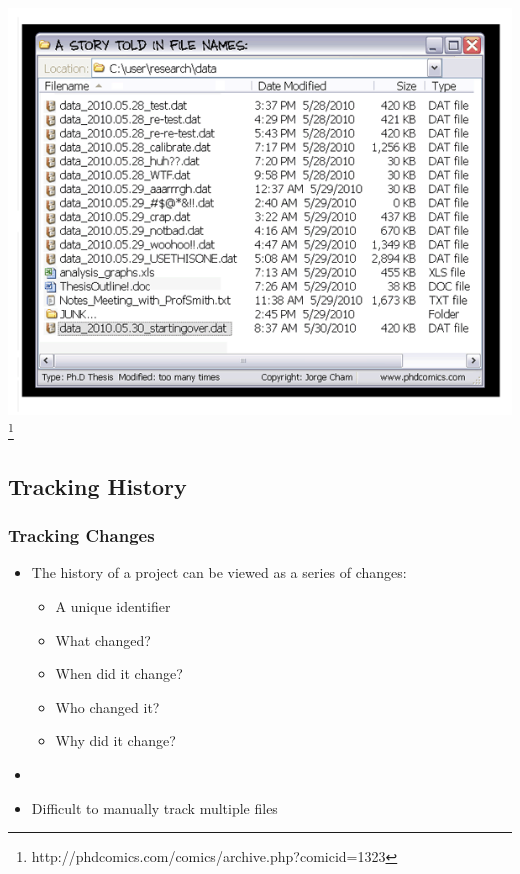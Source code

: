 \begin{frame}
  \centering
  \includegraphics[height=0.95\textheight]{phd1323}
  \footnote{http://phdcomics.com/comics/archive.php?comicid=1323}
\end{frame}

\subsection{Tracking History}

\begin{frame}
  \frametitle{Tracking Changes}
  \begin{itemize}
    \item The history of a project can be viewed as a series of changes:
      \begin{itemize}
        \item A unique identifier
        \item What changed?
        \item When did it change?
        \item Who changed it?
        \item Why did it change?
      \end{itemize}
    \item[]
    \item Difficult to manually track multiple files
  \end{itemize}
\end{frame}

